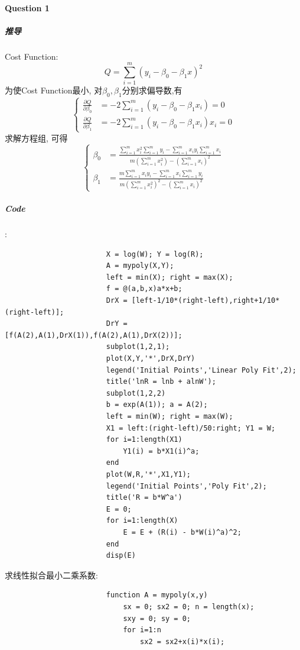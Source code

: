 \documentclass{article}
\begin{document}
\begin{CJK*}{UTF8}{song}
			\paragraph{Question 1}
				\subparagraph{推导}
					Cost Function: 
					$$Q = \sum_{i=1}^{m} \left(y_i -\beta_0 - \beta_1 x\right)^2$$
					为使Cost Function最小, 对$\beta_0,\beta_1$分别求偏导数,有
					$$\left\{
						\begin{aligned}
							\frac{\partial Q}{\partial \beta_0} &= -2\sum_{i=1}^{m}\left(y_i - \beta_0 - \beta_1 x_i \right) = 0 \\
							\frac{\partial Q}{\partial \beta_1} &= -2\sum_{i=1}^{m} \left(y_i - \beta_0 - \beta_1 x_i \right)x_i = 0
						\end{aligned}
					\right.$$
					求解方程组, 可得
					$$
						\left\{
							\begin{aligned}
								\beta_0 &= \frac{\sum\limits_{i=1}^{m} x_i^2 \sum\limits_{i=1}^{m}y_i - \sum\limits_{i=1}^{m}x_i y_i  \sum\limits_{i=1}^{m} x_i }{m\left(\sum\limits_{i=1}^{m}x_i^2 \right) - \left(\sum\limits_{i=1}^{m}x_i \right)^2}\\
								\beta_1 &= \frac{m\sum\limits_{i=1}^{m}x_i y_i - \sum\limits_{i=1}^{m}x_i \sum\limits_{i=1}^{m}y_i}{m\left(\sum\limits_{i=1}^{m}x_i^2 \right)^2 - \left(\sum\limits_{i=1}^{m}x_i \right)^2}	
							\end{aligned}
						\right.$$
				\subparagraph{Code}
					:\newline
					\begin{lstlisting}
						X = log(W); Y = log(R);
						A = mypoly(X,Y);
						left = min(X); right = max(X);
						f = @(a,b,x)a*x+b;
						DrX = [left-1/10*(right-left),right+1/10*(right-left)];
						DrY = [f(A(2),A(1),DrX(1)),f(A(2),A(1),DrX(2))];
						subplot(1,2,1);
						plot(X,Y,'*',DrX,DrY)
						legend('Initial Points','Linear Poly Fit',2);
						title('lnR = lnb + alnW');
						subplot(1,2,2)
						b = exp(A(1)); a = A(2);
						left = min(W); right = max(W);
						X1 = left:(right-left)/50:right; Y1 = W;
						for i=1:length(X1)
							Y1(i) = b*X1(i)^a;
						end
						plot(W,R,'*',X1,Y1);
						legend('Initial Points','Poly Fit',2);
						title('R = b*W^a')
						E = 0;
						for i=1:length(X)
							E = E + (R(i) - b*W(i)^a)^2;
						end
						disp(E)
					\end{lstlisting}
					求线性拟合最小二乘系数:
					\begin{lstlisting}
						function A = mypoly(x,y)
							sx = 0; sx2 = 0; n = length(x);
							sxy = 0; sy = 0;
							for i=1:n
								sx2 = sx2+x(i)*x(i);

\end{lstlisting}
\end{CJK*}
\end{document}
